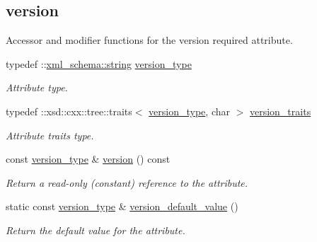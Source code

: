 \subsection*{version}
\label{_amgrp2af72f100c356273d46284f6fd1dfc08}%
Accessor and modifier functions for the version required attribute. \begin{DoxyCompactItemize}
\item 
typedef \+::\hyperlink{namespacexml__schema_aefbaf353f9a0043af46d23d9040ef268}{xml\+\_\+schema\+::string} \hyperlink{classVTKFile__t_a7db6f6d11f363380d6361446f5dede7b}{version\+\_\+type}
\begin{DoxyCompactList}\small\item\em Attribute type. \end{DoxyCompactList}\item 
typedef \+::xsd\+::cxx\+::tree\+::traits$<$ \hyperlink{classVTKFile__t_a7db6f6d11f363380d6361446f5dede7b}{version\+\_\+type}, char $>$ \hyperlink{classVTKFile__t_a5a343e08417564e5db3f48859b1a0c5f}{version\+\_\+traits}
\begin{DoxyCompactList}\small\item\em Attribute traits type. \end{DoxyCompactList}\item 
const \hyperlink{classVTKFile__t_a7db6f6d11f363380d6361446f5dede7b}{version\+\_\+type} \& \hyperlink{classVTKFile__t_af0f1ed9d44019ad1fab6495b6ae71a47}{version} () const 
\begin{DoxyCompactList}\small\item\em Return a read-\/only (constant) reference to the attribute. \end{DoxyCompactList}\item 
static const \hyperlink{classVTKFile__t_a7db6f6d11f363380d6361446f5dede7b}{version\+\_\+type} \& \hyperlink{classVTKFile__t_a0eb5afa9ec6125c0519a891578f31521}{version\+\_\+default\+\_\+value} ()
\begin{DoxyCompactList}\small\item\em Return the default value for the attribute. \end{DoxyCompactList}\end{DoxyCompactItemize}
